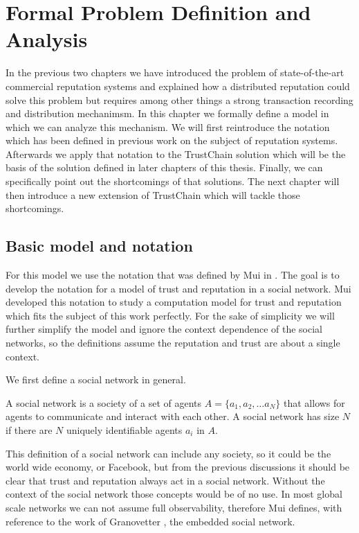 \chapter{Formal Problem Definition and Analysis}
In the previous two chapters we have introduced the problem of state-of-the-art commercial 
reputation systems and explained how a distributed reputation could solve this problem but requires
among other things a strong transaction recording and distribution mechanimsm. In this chapter we
formally define a model in which we can analyze this mechanism. We will first reintroduce the
notation which has been defined in previous work on the subject of reputation systems. Afterwards we
apply that notation to the TrustChain solution which will be the basis of the solution defined
in later chapters of this thesis. Finally, we can specifically point out the shortcomings of that
solutions. The next chapter will then introduce a new extension of TrustChain which will tackle
those shortcomings.


\section{Basic model and notation}
\label{sec:notation}
For this model we use the notation that was defined by Mui in \cite{mui2002computational}. The goal 
is to develop the notation for a model of trust and reputation in a social network. Mui developed 
this notation to study a computation model for trust and reputation which fits the subject of this 
work perfectly. For the sake of simplicity we will further simplify the model and ignore the context
dependence of the social networks, so the definitions assume the reputation and trust are about a
single context.

We first define a social network in general.

\begin{defn}
    A social network is a society of a set of agents $A = \{a_1, a_2, \dots a_N\}$ that allows for agents to communicate and
    interact with each other. A social network has size $N$ if there are $N$ uniquely identifiable
    agents $a_i$ in $A$.
\end{defn}

This definition of a social network can include any society, so it could be the world wide economy,
or Facebook, but from the previous discussions it should be clear that trust and reputation always 
act in a social network. Without the context of the social network those concepts would be of no
use. In most global scale networks we can not assume full observability, therefore Mui defines, with
reference to the work of Granovetter \cite{granovetter1985economic}, the embedded social network.

